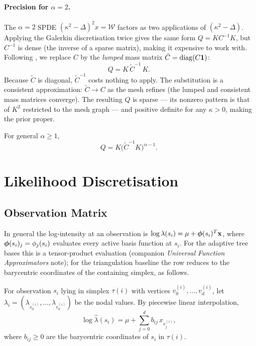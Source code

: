 \documentclass[11pt]{article}
\begin{document}
\paragraph{Precision for $\alpha=2$.}
The $\alpha=2$ SPDE $(\kappa^2-\Delta)^2 x = \mathcal{W}$ factors as two
applications of $(\kappa^2-\Delta)$.  Applying the Galerkin discretisation
twice gives the same form $Q = KC^{-1}K$, but $C^{-1}$ is dense (the inverse
of a sparse matrix), making it expensive to work with.  Following
\citet{lindgren2011}, we replace $C$ by the \emph{lumped} mass matrix
$\tilde{C}=\operatorname{diag}(C\mathbf{1})$:
\begin{equation}
  Q = K \, \tilde{C}^{-1} \, K.
  \label{eq:Q}
\end{equation}
Because $\tilde{C}$ is diagonal, $\tilde{C}^{-1}$ costs nothing to apply.
The substitution is a consistent approximation: $\tilde{C}\to C$ as the mesh
refines (the lumped and consistent mass matrices converge).  The resulting $Q$
is sparse --- its nonzero pattern is that of $K^2$ restricted to the mesh
graph --- and positive definite for any $\kappa>0$, making the prior proper.

For general $\alpha\ge 1$,
\begin{equation}
  Q = K\bigl(\tilde{C}^{-1}K\bigr)^{\alpha-1}.
  \label{eq:Q-general}
\end{equation}
\section{Likelihood Discretisation}

\subsection{Observation Matrix}

In general the log-intensity at an observation is $\log\lambda(s_i) = \mu +
\boldsymbol{\phi}(s_i)^T\mathbf{x}$, where $\boldsymbol{\phi}(s_i)_j = \phi_j(s_i)$ evaluates every active basis
function at $s_i$.  For the adaptive tree bases this is a tensor-product
evaluation (companion \emph{Universal Function Approximators} note); for the
triangulation baseline the row reduces to the barycentric coordinates of the
containing simplex, as follows.

For observation $s_i$ lying in simplex $\tau(i)$ with vertices
$v_0^{(i)}, \ldots, v_d^{(i)}$, let $\lambda_i = (\lambda_{v_0^{(i)}}, \ldots,
\lambda_{v_d^{(i)}})$ be the nodal values.  By piecewise linear interpolation,
\begin{equation}
  \log\hat\lambda(s_i) = \mu + \sum_{j=0}^{d} b_{ij} \, x_{v_j^{(i)}},
\end{equation}
where $b_{ij} \ge 0$ are the barycentric coordinates of $s_i$ in $\tau(i)$.
\end{document}
